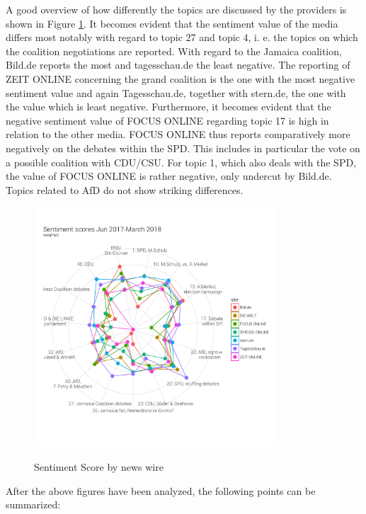 \documentclass[12pt,a4paper,notitlepage]{article}
\begin{document}
A good overview of how differently the topics are discussed by the providers is shown in Figure \ref{fig_sentscore_radar}. It becomes evident that the sentiment value of the media differs most notably with regard to topic 27 and topic 4, i. e. the topics on which the coalition negotiations are reported. With regard to the Jamaica coalition, Bild.de reports the most and tagesschau.de the least negative. The reporting of ZEIT ONLINE concerning the grand coalition is the one with the most negative sentiment value and again Tagesschau.de, together with stern.de, the one with the value which is least negative. Furthermore, it becomes evident that the negative sentiment value of FOCUS ONLINE regarding topic 17 is high in relation to the other media. FOCUS ONLINE thus reports comparatively more negatively on the debates within the SPD. This includes in particular the vote on a possible coalition with CDU/CSU. For topic 1, which also deals with the SPD, the value of FOCUS ONLINE is rather negative, only undercut by Bild.de. Topics related to AfD do not show striking differences. 

\begin{figure}[H]
	\caption{Sentiment Score by news wire}
	\begin{center}
			\includegraphics[width=0.8\textwidth,keepaspectratio]{../figs/sentscore_radar.png}
			\label{fig_sentscore_radar}
	\end{center}
\end{figure}

After the above figures have been analyzed, the following points can be summarized:
\end{document}
